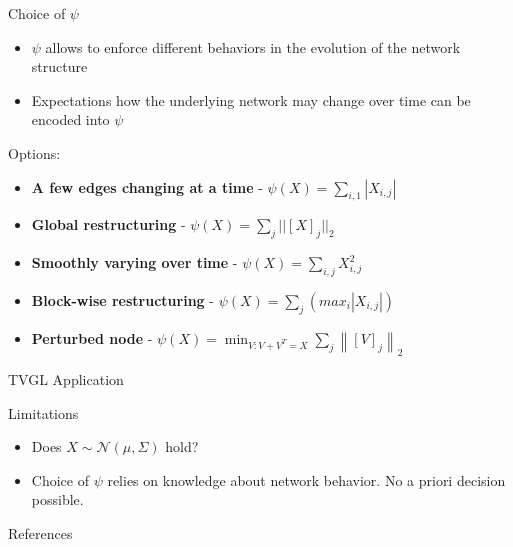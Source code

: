 \documentclass{beamer}
\begin{document}
\begin{frame}{Choice of $\psi$}
    \begin{itemize}
        \item $\psi$ allows to enforce different behaviors in the evolution of the network structure
        \item Expectations how the underlying network may change over time can be encoded into $\psi$
    \end{itemize}
    Options:
    \begin{itemize}
        \item \textbf{A few edges changing at a time} - $\psi(X) = \sum_{i,1}|X_{i,j}|$
        \item \textbf{Global restructuring} - $\psi(X) = \sum_j||[X]_j||_2$
        \item \textbf{Smoothly varying over time} - $\psi(X) = \sum_{i,j}X^2_{i,j}$
        \item \textbf{Block-wise restructuring} - $\psi(X) = \sum_j\left( max_i|X_{i,j}| \right)$
        \item \textbf{Perturbed node} - $\psi(X)=\min _{V: V+V^{T}=X} \sum_{j}\left\|[V]_{j}\right\|_{2}$
    \end{itemize}
\end{frame}

\begin{frame}{TVGL Application}
\end{frame}


\begin{frame}{Limitations}
    \begin{itemize}
        \item Does $X \sim \mathcal{N}(\mu, \Sigma)$ hold?
        \item Choice of $\psi$ relies on knowledge about network behavior.
        No a priori decision possible.
    \end{itemize}
\end{frame}

\begin{frame}{References}
    \nocite{*}
    
    
\end{frame}
\end{document}
